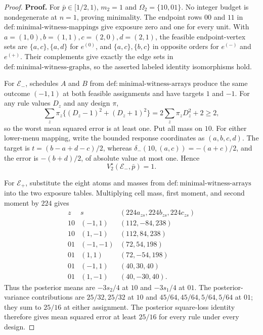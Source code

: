 \documentclass{article}
\begin{document}
\begin{proof}
\textbf{Proof.}
For \(\bar p\in[1/2,1)\), \(m_2=1\) and \(\Omega_2=\{10,01\}\). No integer budget is nondegenerate at \(n=1\), proving minimality. The endpoint rows \(00\) and \(11\) in \(\mathrm{def{:}minimal\text{-}witness\text{-}mappings}\) give exposure zero and one for every unit. With \(a=(1,0),b=(1,1),c=(2,0),d=(2,1)\), the feasible endpoint-vertex sets are \(\{a,c\},\{a,d\}\) for \(e^{(0)}\), and \(\{a,c\},\{b,c\}\) in opposite orders for \(e^{(-)}\) and \(e^{(+)}\). Their complements give exactly the edge sets in \(\mathrm{def{:}minimal\text{-}witness\text{-}graphs}\), so the asserted labeled identity isomorphisms hold.

For \(\mathcal E_-\), schedules \(A\) and \(B\) from \(\mathrm{def{:}minimal\text{-}witness\text{-}arrays}\) produce the same outcome \((-1,1)\) at both feasible assignments and have targets \(1\) and \(-1\). For any rule values \(D_z\) and any design \(\pi\),
\[
 \sum_z\pi_z\{(D_z-1)^2+(D_z+1)^2\}
 =2\sum_z\pi_zD_z^2+2\ge2,
\]
so the worst mean squared error is at least one. Put all mass on \(10\). For either lower-menu mapping, write the bounded response coordinates as \((a,b,c,d)\). The target is \(t=(b-a+d-c)/2\), whereas \(\delta_-(10,(a,c))=-(a+c)/2\), and the error is \(-(b+d)/2\), of absolute value at most one. Hence
\[
 V_2^\star(\mathcal E_-,\bar p)=1. \tag{1}
\]

For \(\mathcal E_+\), substitute the eight atoms and masses from \(\mathrm{def{:}minimal\text{-}witness\text{-}arrays}\) into the two exposure tables. Multiplying cell mass, first moment, and second moment by \(224\) gives
\[
\begin{array}{c|c|c}
z&s&(224a_{zs},224b_{zs},224c_{zs})\\ \hline
10&(-1,1)&(112,-84,238)\\
10&(1,-1)&(112,84,238)\\
01&(-1,-1)&(72,54,198)\\
01&(1,1)&(72,-54,198)\\
01&(-1,1)&(40,30,40)\\
01&(1,-1)&(40,-30,40).
\end{array} \tag{2}
\]
Thus the posterior means are \(-3s_2/4\) at \(10\) and \(-3s_1/4\) at \(01\). The posterior-variance contributions are \(25/32,25/32\) at \(10\) and \(45/64,45/64,5/64,5/64\) at \(01\); they sum to \(25/16\) at either assignment. The posterior square-loss identity therefore gives mean squared error at least \(25/16\) for every rule under every design.


\end{proof}
\end{document}
